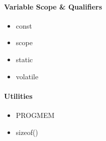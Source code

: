 \documentclass[../informe_krapp.tex]{subfiles}
\begin{document}
\begin{multicols}{2}
	\paragraph{Variable Scope \& Qualifiers}
	\begin{itemize}
		\item const
		\item scope
		\item static
		\item volatile
	\end{itemize}

	\paragraph{Utilities}
	\begin{itemize}
		\item PROGMEM
		\item sizeof()
	\end{itemize}
\end{multicols}

\clearpage
\end{document}
